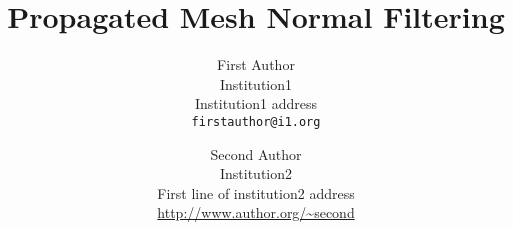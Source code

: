 \documentclass[10pt,twocolumn,letterpaper]{article}
\begin{document}
\title{Propagated Mesh Normal Filtering}

\author{First Author\\
Institution1\\
Institution1 address\\
{\tt\small firstauthor@i1.org}
\and
Second Author\\
Institution2\\
First line of institution2 address\\
{\small\url{http://www.author.org/~second}}
}

\maketitle





%
%


{\small


}
\end{document}
